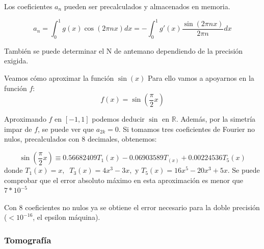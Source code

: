		\begin{obs}
			Los coeficientes $a_n$ pueden ser precalculados y almacenados en memoria.

			$$ a_n = \int^{1}_{0} g(x) \cos (2 \pi n x) dx = - \int^{1}_{0} g'(x) \frac{\sin (2 \pi n x)}{2 \pi n} dx $$

			También se puede determinar el N de antemano dependiendo de la precisión exigida.
		\end{obs}


		\begin{example}{Veamos cómo aproximar la función $\sin(x)$}
			Para ello vamos a apoyarnos en la función $f$:
			$$f(x) = \sin\left(\frac{\pi}{2} x\right) $$

			Aproximando $f$ en $[-1,1]$ podemos deducir $\sin$ en $\mathbb{R}$. Además, por la simetría impar de $f$, se puede ver que $a_{2k} = 0$. Si tomamos tres coeficientes de Fourier no nulos, precalculados con 8 decimales, obtenemos:

			$$\sin \left(\frac{\pi}{2} x\right) \equiv 0.56682409T_1(x)-0.06903589T_(x)+0.00224536T_5(x)$$
			donde $T_1(x)=x , \; \; T_3 (x) = 4x^3 - 3x, \text{ y } T_5(x)= 16x^5 - 20x^3 + 5x$. Se puede comprobar que el error absoluto máximo en esta aproximación es menor que $ 7 * 10^{-5}$

			Con 8 coeficientes no nulos ya se obtiene el error necesario para la doble precisión ($ < 10^{-16}$, el epsilon máquina).


		\end{example}

\subsubsection{Tomografía}

